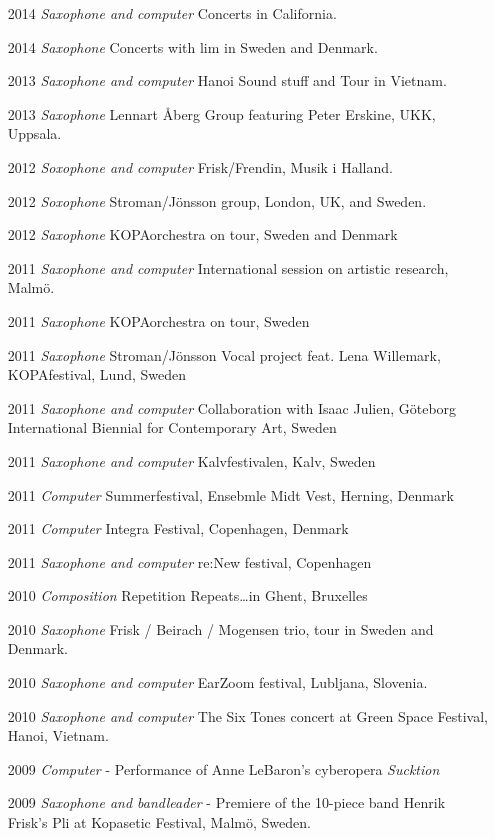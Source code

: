 \begin{enumerate}
\item [2014] \emph{Saxophone and computer} Concerts in California.
\item [2014] \emph{Saxophone} Concerts with lim in Sweden and Denmark.
\item [2013] \emph{Saxophone and computer} Hanoi Sound stuff and Tour in Vietnam.
\item [2013] \emph{Saxophone} Lennart \r{A}berg Group featuring Peter Erskine, UKK, Uppsala.
\item [2012] \emph{Soxophone and computer} Frisk/Frendin, Musik i Halland.
\item [2012] \emph{Soxophone} Stroman/J\"{o}nsson group, London, UK, and Sweden.
\item [2012] \emph{Saxophone} KOPAorchestra on tour, Sweden and Denmark
\item [2011] \emph{Saxophone and computer} International session on artistic research, Malm\"o.
\item [2011] \emph{Saxophone} KOPAorchestra on tour, Sweden
\item [2011] \emph{Saxophone} Stroman/J\"onsson Vocal project feat. Lena Willemark, KOPAfestival, Lund, Sweden
\item [2011] \emph{Saxophone and computer} Collaboration with Isaac Julien, G\"oteborg International Biennial for Contemporary Art, Sweden
\item [2011] \emph{Saxophone and computer} Kalvfestivalen, Kalv, Sweden
\item [2011] \emph{Computer} Summerfestival, Ensebmle Midt Vest, Herning, Denmark
\item [2011] \emph{Computer} Integra Festival, Copenhagen, Denmark
\item [2011] \emph{Saxophone and computer} re:New festival, Copenhagen
\item [2010] \emph{Composition} Repetition Repeats\ldots in Ghent, Bruxelles
\item [2010] \emph{Saxophone} Frisk / Beirach / Mogensen trio, tour in Sweden and Denmark.
\item [2010] \emph{Saxophone and computer} EarZoom festival, Lubljana, Slovenia.
\item [2010] \emph{Saxophone and computer} The Six Tones concert at Green Space Festival, Hanoi, Vietnam.
\item [2009] \emph{Computer} - Performance of Anne LeBaron's cyberopera \emph{Sucktion}
\item [2009] \emph{Saxophone and bandleader} - Premiere of the 10-piece band Henrik Frisk's Pli at Kopasetic Festival, Malm\"o, Sweden.

\end{enumerate}
